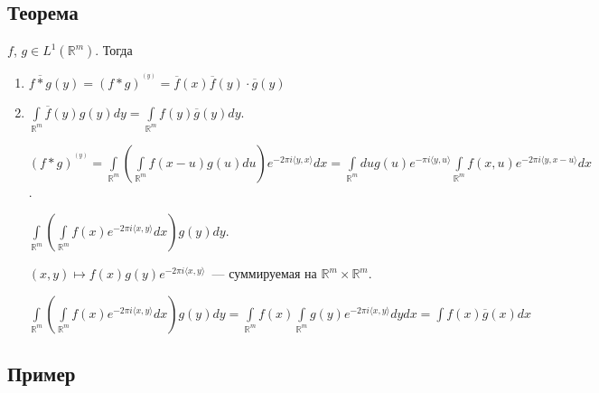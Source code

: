 \documentclass{article}
\begin{document}
    \subsection{Теорема}
    
        $f$, $g \in L^1 \left( \mathbb{R}^m \right)$. Тогда
        
        \begin{enumerate}
        
            \item $\overline{f * g}(y) = (f * g)^^(y) = \overline{f}(x) \overline{f}(y) \cdot \overline{g}(y)$
            
            \item $\int\limits_{\mathbb{R}^m} \overline{f}(y) g(y) dy = \int\limits_{\mathbb{R}^m} f(y) \overline{g}(y) dy$.
            
                $(f * g)^^ (y) = \int\limits_{\mathbb{R}^m} \left( \int\limits_{\mathbb{R}^m} f(x - u) g(u) du \right) e^{-2 \pi i \langle y, x \rangle} dx = \int\limits_{\mathbb{R}^m} du g(u) e^{-\pi i \langle y, u \rangle} \int\limits_{\mathbb{R}^m} f(x, u) e^{-2 \pi i \langle y, x - u \rangle} dx$.
            
                $\int\limits_{\mathbb{R}^m} \left( \int\limits_{\mathbb{R}^m} f(x) e^{-2 \pi i \langle x, y \rangle} dx \right) g(y) dy$.
                
                $(x, y) \mapsto f(x) g(y) e^{-2 \pi i \langle x, y \rangle}$~--- суммируемая на $\mathbb{R}^m \times \mathbb{R}^m$.
                
                $\int\limits_{\mathbb{R}^m} \left( \int\limits_{\mathbb{R}^m} f(x) e^{-2 \pi i \langle x, y \rangle} dx \right) g(y) dy = \int\limits_{\mathbb{R}^m} f(x) \int\limits_{\mathbb{R}^m} g(y) e^{-2 \pi i \langle x, y \rangle} dy dx = \int f(x) \overline{g}(x) dx$
                
        \end{enumerate}
        
    \subsection{Пример}
    
\end{document}
